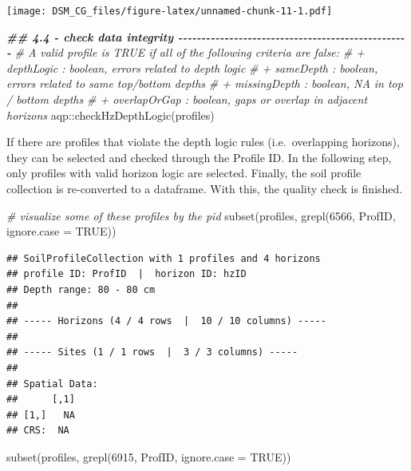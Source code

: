 \documentclass[
  10pt,
  b5paper,
  oneside]{book}
\newenvironment{Shaded}{\begin{snugshade}}{\end{snugshade}}
\newcommand{\AttributeTok}[1]{\textcolor[rgb]{0.77,0.63,0.00}{#1}}
\newcommand{\CommentTok}[1]{\textcolor[rgb]{0.56,0.35,0.01}{\textit{#1}}}
\newcommand{\ConstantTok}[1]{\textcolor[rgb]{0.00,0.00,0.00}{#1}}
\newcommand{\DecValTok}[1]{\textcolor[rgb]{0.00,0.00,0.81}{#1}}
\newcommand{\DocumentationTok}[1]{\textcolor[rgb]{0.56,0.35,0.01}{\textbf{\textit{#1}}}}
\newcommand{\FunctionTok}[1]{\textcolor[rgb]{0.00,0.00,0.00}{#1}}
\newcommand{\NormalTok}[1]{#1}
\newcommand{\SpecialCharTok}[1]{\textcolor[rgb]{0.00,0.00,0.00}{#1}}
\begin{document}
\texttt{[image: DSM\_CG\_files/figure-latex/unnamed-chunk-11-1.pdf]}

\begin{Shaded}
\begin{Highlighting}[]
\DocumentationTok{\#\# 4.4 {-} check data integrity {-}{-}{-}{-}{-}{-}{-}{-}{-}{-}{-}{-}{-}{-}{-}{-}{-}{-}{-}{-}{-}{-}{-}{-}{-}{-}{-}{-}{-}{-}{-}{-}{-}{-}{-}{-}{-}{-}{-}{-}{-}{-}{-}{-}{-}{-}{-}{-}{-}{-}}
\CommentTok{\# A valid profile is TRUE if all of the following criteria are false:}
\CommentTok{\#    + depthLogic : boolean, errors related to depth logic}
\CommentTok{\#    + sameDepth : boolean, errors related to same top/bottom depths}
\CommentTok{\#    + missingDepth : boolean, NA in top / bottom depths}
\CommentTok{\#    + overlapOrGap : boolean, gaps or overlap in adjacent horizons}
\NormalTok{aqp}\SpecialCharTok{::}\FunctionTok{checkHzDepthLogic}\NormalTok{(profiles)}
\end{Highlighting}
\end{Shaded}

If there are profiles that violate the depth logic rules (i.e.~overlapping horizons), they can be selected and checked through the Profile ID. In the following step, only profiles with valid horizon logic are selected. Finally, the soil profile collection is re-converted to a dataframe. With this, the quality check is finished.

\begin{Shaded}
\begin{Highlighting}[]
\CommentTok{\# visualize some of these profiles by the pid}
\FunctionTok{subset}\NormalTok{(profiles, }\FunctionTok{grepl}\NormalTok{(}\DecValTok{6566}\NormalTok{, ProfID, }\AttributeTok{ignore.case =} \ConstantTok{TRUE}\NormalTok{))}
\end{Highlighting}
\end{Shaded}

\begin{verbatim}
## SoilProfileCollection with 1 profiles and 4 horizons
## profile ID: ProfID  |  horizon ID: hzID 
## Depth range: 80 - 80 cm
## 
## ----- Horizons (4 / 4 rows  |  10 / 10 columns) -----
## 
## ----- Sites (1 / 1 rows  |  3 / 3 columns) -----
## 
## Spatial Data:
##      [,1]
## [1,]   NA
## CRS:  NA
\end{verbatim}

\begin{Shaded}
\begin{Highlighting}[]
\FunctionTok{subset}\NormalTok{(profiles, }\FunctionTok{grepl}\NormalTok{(}\DecValTok{6915}\NormalTok{, ProfID, }\AttributeTok{ignore.case =} \ConstantTok{TRUE}\NormalTok{))}
\end{Highlighting}
\end{Shaded}
\end{document}
